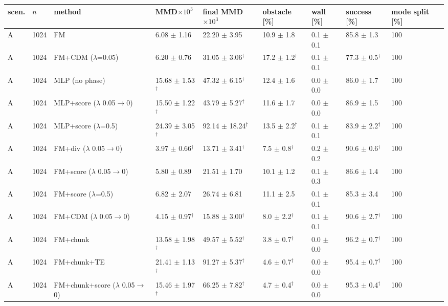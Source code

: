 \begin{tabular}{lllllllll}
\toprule
scen. & $n$ & method & MMD$\times10^3$ & final MMD$\times10^3$ & obstacle [\%] & wall [\%] & success [\%] & mode split [\%] \\
\midrule
A & 1024 & FM & 6.08 $\pm$ 1.16 & 22.20 $\pm$ 3.95 & 10.9 $\pm$ 1.8 & 0.1 $\pm$ 0.1 & 85.8 $\pm$ 1.3 & 100 \\
A & 1024 & FM+CDM ($\lambda$=0.05) & 6.20 $\pm$ 0.76 & 31.05 $\pm$ 3.06$^\dagger$ & 17.2 $\pm$ 1.2$^\dagger$ & 0.1 $\pm$ 0.1 & 77.3 $\pm$ 0.5$^\dagger$ & 100 \\
A & 1024 & MLP (no phase) & 15.68 $\pm$ 1.53$^\dagger$ & 47.32 $\pm$ 6.15$^\dagger$ & 12.4 $\pm$ 1.6 & 0.0 $\pm$ 0.0 & 86.0 $\pm$ 1.7 & 100 \\
A & 1024 & MLP+score ($\lambda$ 0.05$\to$0) & 15.50 $\pm$ 1.22$^\dagger$ & 43.79 $\pm$ 5.27$^\dagger$ & 11.6 $\pm$ 1.7 & 0.0 $\pm$ 0.0 & 86.9 $\pm$ 1.5 & 100 \\
A & 1024 & MLP+score ($\lambda$=0.5) & 24.39 $\pm$ 3.05$^\dagger$ & 92.14 $\pm$ 18.24$^\dagger$ & 13.5 $\pm$ 2.2$^\dagger$ & 0.1 $\pm$ 0.1 & 83.9 $\pm$ 2.2$^\dagger$ & 100 \\
A & 1024 & FM+div ($\lambda$ 0.05$\to$0) & 3.97 $\pm$ 0.66$^\dagger$ & 13.71 $\pm$ 3.41$^\dagger$ & 7.5 $\pm$ 0.8$^\dagger$ & 0.2 $\pm$ 0.2 & 90.6 $\pm$ 0.6$^\dagger$ & 100 \\
A & 1024 & FM+score ($\lambda$ 0.05$\to$0) & 5.80 $\pm$ 0.89 & 21.51 $\pm$ 1.70 & 10.1 $\pm$ 1.2 & 0.1 $\pm$ 0.3 & 86.6 $\pm$ 1.4 & 100 \\
A & 1024 & FM+score ($\lambda$=0.5) & 6.82 $\pm$ 2.07 & 26.74 $\pm$ 6.81 & 11.1 $\pm$ 2.5 & 0.1 $\pm$ 0.1 & 85.3 $\pm$ 3.4 & 100 \\
A & 1024 & FM+CDM ($\lambda$ 0.05$\to$0) & 4.15 $\pm$ 0.97$^\dagger$ & 15.88 $\pm$ 3.00$^\dagger$ & 8.0 $\pm$ 2.2$^\dagger$ & 0.1 $\pm$ 0.1 & 90.6 $\pm$ 2.7$^\dagger$ & 100 \\
A & 1024 & FM+chunk & 13.58 $\pm$ 1.98$^\dagger$ & 49.57 $\pm$ 5.52$^\dagger$ & 3.8 $\pm$ 0.7$^\dagger$ & 0.0 $\pm$ 0.0 & 96.2 $\pm$ 0.7$^\dagger$ & 100 \\
A & 1024 & FM+chunk+TE & 21.41 $\pm$ 1.13$^\dagger$ & 91.27 $\pm$ 5.37$^\dagger$ & 4.6 $\pm$ 0.7$^\dagger$ & 0.0 $\pm$ 0.0 & 95.4 $\pm$ 0.7$^\dagger$ & 100 \\
A & 1024 & FM+chunk+score ($\lambda$ 0.05$\to$0) & 15.46 $\pm$ 1.97$^\dagger$ & 66.25 $\pm$ 7.82$^\dagger$ & 4.7 $\pm$ 0.4$^\dagger$ & 0.0 $\pm$ 0.0 & 95.3 $\pm$ 0.4$^\dagger$ & 100 \\

\end{tabular}
